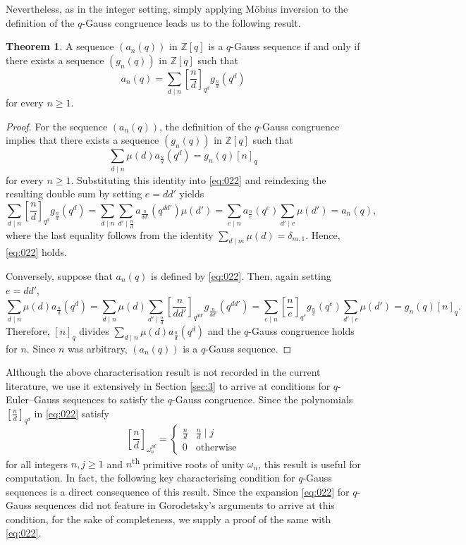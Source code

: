 \documentclass{article}
\numberwithin{equation}{section}
\theoremstyle{definition}
\newtheorem*{theorem*}{Theorem}
\begin{document}
Nevertheless, as in the integer setting, simply applying M\"{o}bius inversion to the definition of the $q$-Gauss congruence leads us to the following result.
\begin{theorem*}
    A sequence $(a_n(q))$ in $\mathbb{Z}[q]$ is a $q$-Gauss sequence if and only if there exists a sequence $(g_n(q))$ in $\mathbb{Z}[q]$ such that
\begin{equation}\label{eq:022}
a_n(q)=\sum_{d\mid n}\left[\frac{n}{d}\right]_{q^d}g_{\frac{n}{d}}(q^d)
\end{equation}
for every $n\geq1$.
\end{theorem*}
\begin{proof}
For the sequence $(a_n(q))$, the definition of the $q$-Gauss congruence implies that there exists a sequence $(g_n(q))$ in $\mathbb{Z}[q]$ such that
\[
\sum_{d\mid n}\mu(d)a_{\frac{n}{d}}(q^d)=g_n(q)[n]_q
\]
for every $n\geq1$. Substituting this identity into \eqref{eq:022} and reindexing the resulting double sum by setting $e=dd'$ yields
\[
\sum_{d\mid n}\left[\frac{n}{d}\right]_{q^d}g_{\frac{n}{d}}(q^d)
=\sum_{d\mid n}\sum_{d'\mid\frac{n}{d}}
a_{\frac{n}{dd'}}(q^{dd'})\mu(d')
=\sum_{e\mid n}a_{\frac{n}{e}}(q^e)\sum_{d'\mid e}\mu(d')
=a_n(q),
\]
where the last equality follows from the identity
$\sum_{d\mid m}\mu(d)=\delta_{m,1}$. Hence, \eqref{eq:022} holds.

Conversely, suppose that $a_n(q)$ is defined by \eqref{eq:022}. Then, again setting $e=dd'$,
\[
\sum_{d\mid n}\mu(d)a_{\frac{n}{d}}(q^d)
=\sum_{d\mid n}\mu(d)\sum_{d'\mid\frac{n}{d}}
\left[\frac{n}{dd'}\right]_{q^{dd'}}
g_{\frac{n}{dd'}}(q^{dd'})
=\sum_{e\mid n}\left[\frac{n}{e}\right]_{q^e}
g_{\frac{n}{e}}(q^e)\sum_{d'\mid e}\mu(d')
=g_n(q)[n]_q.
\]
Therefore, $[n]_q$ divides
$\sum_{d\mid n}\mu(d)a_{\frac{n}{d}}(q^d)$ and the $q$-Gauss congruence holds for $n$. Since $n$ was arbitrary, $(a_n(q))$ is a $q$-Gauss sequence.
\end{proof}
Although the above characterisation result is not recorded in the current literature, we use it extensively in Section \ref{sec:3} to arrive at conditions for $q$-Euler--Gauss sequences to satisfy the $q$-Gauss congruence.  
Since the polynomials $\left[\frac{n}{d}\right]_{q^d}$ in \eqref{eq:022} satisfy
\begin{equation}\label{eq:023}
    \left[\frac{n}{d}\right]_{\omega_n^{jd}}=
    \begin{cases}
        \frac{n}{d}&\frac{n}{d}\mid j\\
        0&\text{otherwise}
    \end{cases}
\end{equation}
for all integers $n,j\geq1$ and $n$\textsuperscript{th} primitive roots of unity $\omega_n$, this result is useful for computation. In fact, the following key characterising condition for $q$-Gauss sequences is a direct consequence of this result. Since the expansion \eqref{eq:022} for $q$-Gauss sequences did not feature in Gorodetsky's arguments to arrive at this condition, for the sake of completeness, we supply a proof of the same with \eqref{eq:022}. 
\end{document}
